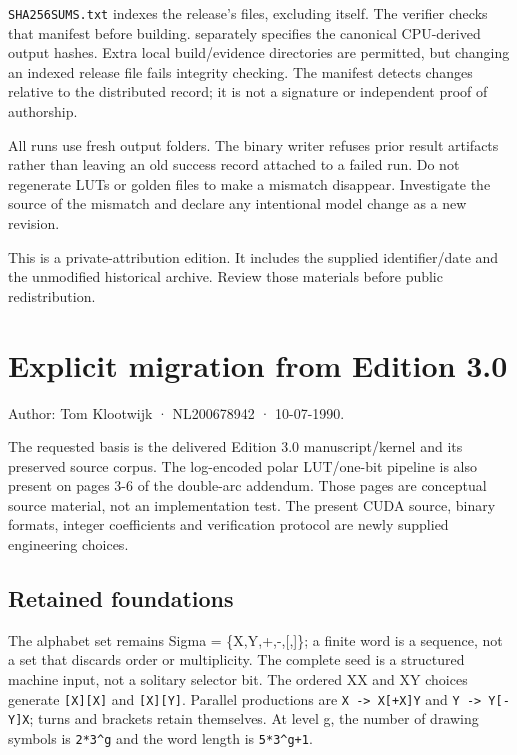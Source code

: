 \documentclass[11pt,a4paper]{article}
\begin{document}
\texttt{SHA256SUMS.txt} indexes the release's files, excluding itself. The verifier checks that manifest before building.  separately specifies the canonical CPU-derived output hashes. Extra local build/evidence directories are permitted, but changing an indexed release file fails integrity checking. The manifest detects changes relative to the distributed record; it is not a signature or independent proof of authorship.

All runs use fresh output folders. The binary writer refuses prior result artifacts rather than leaving an old success record attached to a failed run. Do not regenerate LUTs or golden files to make a mismatch disappear. Investigate the source of the mismatch and declare any intentional model change as a new revision.

This is a private-attribution edition. It includes the supplied identifier/date and the unmodified historical archive. Review those materials before public redistribution.

\clearpage

\section{Explicit migration from Edition 3.0}\label{explicit-migration-from-edition-3.0}

Author: Tom Klootwijk · NL200678942 · 10-07-1990.

The requested basis is the delivered Edition 3.0 manuscript/kernel and its preserved source corpus. The log-encoded polar LUT/one-bit pipeline is also present on pages 3-6 of the double-arc addendum. Those pages are conceptual source material, not an implementation test. The present CUDA source, binary formats, integer coefficients and verification protocol are newly supplied engineering choices.

\subsection{Retained foundations}\label{retained-foundations}

The alphabet set remains Sigma = \{X,Y,+,-,{[},{]}\}; a finite word is a sequence, not a set that discards order or multiplicity. The complete seed is a structured machine input, not a solitary selector bit. The ordered XX and XY choices generate \texttt{{[}X{]}{[}X{]}} and \texttt{{[}X{]}{[}Y{]}}. Parallel productions are \texttt{X\ -\textgreater{}\ X{[}+X{]}Y} and \texttt{Y\ -\textgreater{}\ Y{[}-Y{]}X}; turns and brackets retain themselves. At level g, the number of drawing symbols is \texttt{2*3\^{}g} and the word length is \texttt{5*3\^{}g+1}.
\end{document}
